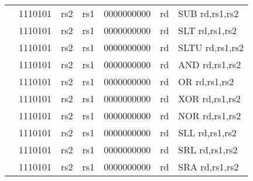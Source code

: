 \begin{table}[p]
\begin{small}
\begin{center}
\begin{tabular}{rcccccccccccl}
&
\multicolumn{2}{|c|}{1110101} &
\multicolumn{1}{c|}{rs2} &
\multicolumn{1}{c|}{rs1} &
\multicolumn{6}{c|}{0000000000} &
\multicolumn{1}{c|}{rd} & SUB rd,rs1,rs2 \\
\cline{2-12}
  

&
\multicolumn{2}{|c|}{1110101} &
\multicolumn{1}{c|}{rs2} &
\multicolumn{1}{c|}{rs1} &
\multicolumn{6}{c|}{0000000000} &
\multicolumn{1}{c|}{rd} & SLT rd,rs1,rs2 \\
\cline{2-12}
  

&
\multicolumn{2}{|c|}{1110101} &
\multicolumn{1}{c|}{rs2} &
\multicolumn{1}{c|}{rs1} &
\multicolumn{6}{c|}{0000000000} &
\multicolumn{1}{c|}{rd} & SLTU rd,rs1,rs2 \\
\cline{2-12}
  

&
\multicolumn{2}{|c|}{1110101} &
\multicolumn{1}{c|}{rs2} &
\multicolumn{1}{c|}{rs1} &
\multicolumn{6}{c|}{0000000000} &
\multicolumn{1}{c|}{rd} & AND rd,rs1,rs2 \\
\cline{2-12}
  

&
\multicolumn{2}{|c|}{1110101} &
\multicolumn{1}{c|}{rs2} &
\multicolumn{1}{c|}{rs1} &
\multicolumn{6}{c|}{0000000000} &
\multicolumn{1}{c|}{rd} & OR rd,rs1,rs2 \\
\cline{2-12}
  

&
\multicolumn{2}{|c|}{1110101} &
\multicolumn{1}{c|}{rs2} &
\multicolumn{1}{c|}{rs1} &
\multicolumn{6}{c|}{0000000000} &
\multicolumn{1}{c|}{rd} & XOR rd,rs1,rs2 \\
\cline{2-12}
  

&
\multicolumn{2}{|c|}{1110101} &
\multicolumn{1}{c|}{rs2} &
\multicolumn{1}{c|}{rs1} &
\multicolumn{6}{c|}{0000000000} &
\multicolumn{1}{c|}{rd} & NOR rd,rs1,rs2 \\
\cline{2-12}
  

&
\multicolumn{2}{|c|}{1110101} &
\multicolumn{1}{c|}{rs2} &
\multicolumn{1}{c|}{rs1} &
\multicolumn{6}{c|}{0000000000} &
\multicolumn{1}{c|}{rd} & SLL rd,rs1,rs2 \\
\cline{2-12}
  

&
\multicolumn{2}{|c|}{1110101} &
\multicolumn{1}{c|}{rs2} &
\multicolumn{1}{c|}{rs1} &
\multicolumn{6}{c|}{0000000000} &
\multicolumn{1}{c|}{rd} & SRL rd,rs1,rs2 \\
\cline{2-12}
  

&
\multicolumn{2}{|c|}{1110101} &
\multicolumn{1}{c|}{rs2} &
\multicolumn{1}{c|}{rs1} &
\multicolumn{6}{c|}{0000000000} &
\multicolumn{1}{c|}{rd} & SRA rd,rs1,rs2 \\
\cline{2-12}
  


\end{tabular}
\end{center}
\end{small}
\end{table}
